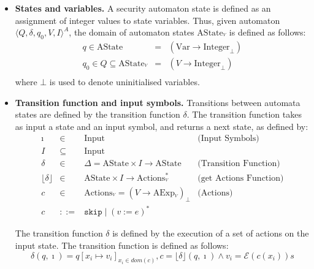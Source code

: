 \documentclass[10pt,notitlepage,twoside]{article}
\newcommand{\automata}[5]{\langle #1,#2,#3,#4,#5 \rangle^A}
\newcommand{\theautomaton}{\automata{Q}{\delta}{q_0}{V}{I}}
\newcommand{\floor}[1]{\lfloor #1 \rfloor}
\newcommand{\ssub}[1]{_{{}^#1}}
\begin{document}
\begin{itemize}
\item \textbf{States and variables.} A security automaton state is defined as an assignment of integer values to state variables. Thus, given automaton $\theautomaton$, the domain of automaton states $\textrm{AState}\ssub{V}$ is defined as follows:
\begin{displaymath}
\begin{array}{rcl}
q  \in \textrm{AState} & = & (\textrm{Var} \rightarrow \textrm{Integer}_\bot) \\
q_0 \in Q  \subseteq  \textrm{AState}\ssub{V} & = & (V \rightarrow \textrm{Integer}_\bot) \\
\end{array}
\end{displaymath}
where $\bot$ is used to denote uninitialised variables.

\item \textbf{Transition function and input symbols.} Transitions between automata states are defined by the transition function $\delta$. The transition function takes as input a state and an input symbol, and returns a next state, as defined by:
\begin{displaymath}
\begin{array}{rcll}
\imath  & \in & \textrm{Input} & \mbox{(Input Symbols)} \\
I & \subseteq & \textrm{Input} \\
\delta & \in & \Delta = \textrm{AState} \times I \rightarrow \textrm{AState} & \mbox{(Transition Function)} \\
\floor{\delta} & \in & \textrm{AState} \times I \rightarrow \textrm{Actions}\ssub{V}^* & \mbox{(get Actions Function)} \\
c & \in & \textrm{Actions}\ssub{V} = (V \rightarrow \textrm{AExp}\ssub{V})_\bot  & \mbox{(Actions)} \\
c & ::= & \texttt{skip} \mid (v := e)^*
\end{array}
\end{displaymath}

The transition function $\delta$ is defined by the execution of a set of actions on the input state. The transition function is defined as follows:
\begin{displaymath}
\delta(q,\imath) = q[x_i \mapsto v_i]_{x_i \in dom(c)}, c = \floor{\delta}(q,\imath) \wedge v_i = \mathcal{E}(c(x_i))s
\end{displaymath}

\end{itemize}
\end{document}
